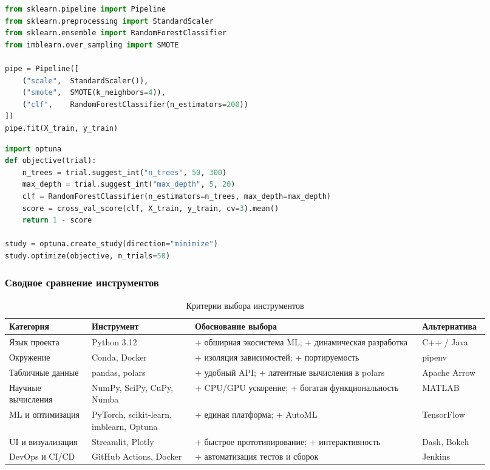 \begin{lstlisting}[language=Python, caption={Пример Pipeline с SMOTE и RandomForest}, label={lst:pipeline}]
from sklearn.pipeline import Pipeline
from sklearn.preprocessing import StandardScaler
from sklearn.ensemble import RandomForestClassifier
from imblearn.over_sampling import SMOTE

pipe = Pipeline([
    ("scale",  StandardScaler()),
    ("smote",  SMOTE(k_neighbors=4)),
    ("clf",    RandomForestClassifier(n_estimators=200))
])
pipe.fit(X_train, y_train)
\end{lstlisting}

\begin{lstlisting}[language=Python, caption={Optuna-оптимизация параметров модели}, label={lst:optuna_example}]
import optuna
def objective(trial):
    n_trees = trial.suggest_int("n_trees", 50, 300)
    max_depth = trial.suggest_int("max_depth", 5, 20)
    clf = RandomForestClassifier(n_estimators=n_trees, max_depth=max_depth)
    score = cross_val_score(clf, X_train, y_train, cv=3).mean()
    return 1 - score

study = optuna.create_study(direction="minimize")
study.optimize(objective, n_trials=50)
\end{lstlisting}

\subsubsection{Сводное сравнение инструментов}
\label{subsubsec:tool_choice}

\begin{table}[h]
\centering\small
\caption{Критерии выбора инструментов}
\label{tab:tool_choice}
\begin{tabular}{@{}p{0.16\linewidth}p{0.20\linewidth}p{0.44\linewidth}p{0.12\linewidth}@{}}
\toprule
\textbf{Категория} & \textbf{Инструмент} & \textbf{Обоснование выбора} & \textbf{Альтернатива} \\ \midrule
Язык проекта       & Python 3.12 & + обширная экосистема ML; + динамическая разработка  & C++ / Java \\[2pt]
Окружение          & Conda, Docker & + изоляция зависимостей; + портируемость & pipenv \\[2pt]
Табличные данные   & pandas, polars & + удобный API; + латентные вычисления в polars & Apache Arrow \\[2pt]
Научные вычисления & NumPy, SciPy, CuPy, Numba & + CPU/GPU ускорение; + богатая функциональность & MATLAB \\[2pt]
ML и оптимизация   & PyTorch, scikit-learn, imblearn, Optuna & + единая платформа; + AutoML & TensorFlow \\[2pt]
UI и визуализация  & Streamlit, Plotly & + быстрое прототипирование; + интерактивность & Dash, Bokeh \\[2pt]
DevOps и CI/CD     & GitHub Actions, Docker & + автоматизация тестов и сборок & Jenkins \\ 
\bottomrule
\end{tabular}
\end{table}

